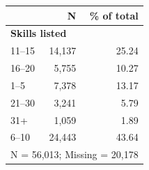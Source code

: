 \begin{tabular}{lrr}


\toprule


 & N & \% of total \\


\midrule


\multicolumn{3}{l}{\textbf{Skills listed}}\\ 
\midrule
11–15               &      14,137&       25.24\\
16–20               &       5,755&       10.27\\
1–5                 &       7,378&       13.17\\
21–30               &       3,241&        5.79\\
31+                 &       1,059&        1.89\\
6–10                &      24,443&       43.64\\
\midrule


\multicolumn{3}{l}{\footnotesize N =       56,013; Missing =       20,178}\\


\bottomrule


\end{tabular}


